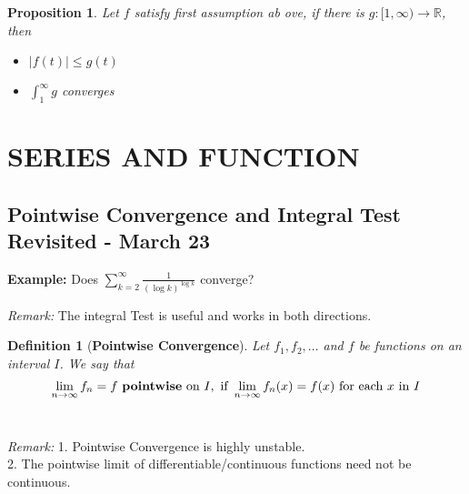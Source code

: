 \documentclass[12pt]{article}
\theoremstyle{plain}
\newtheorem{definition}{Definition}[subsection]
\newtheorem{proposition}{Proposition}[subsection]
\newcommand{\abs}[1]{\left| #1 \right|}
\newcommand{\mR}{{\mathbb{R}}}
\begin{document}
\begin{proposition}
	Let $f$ satisfy first assumption ab ove, if there is $g:[1,\infty) \to
	\mR$, then 
	\begin{itemize}
		\item $\abs{f(t)} \leq g(t)$
		\item $\int_1^{\infty} g$ converges
	\end{itemize}
\end{proposition}




\section{SERIES AND FUNCTION}
\subsection{Pointwise Convergence and Integral Test Revisited - March 23}
{\color{Brown}
	\textbf{Example: } Does $\sum_{k=2}^{\infty} \frac1{(\log k)^{\log k}}$
	converge? 
}

{\color{Orchid}
\textit{Remark: } The integral Test is useful and works in both directions.\\ 
}

\begin{definition}[\textbf{Pointwise Convergence}]
	Let $f_1, f_2, \ldots$  and $f$ be functions on an interval $I$. We say
	that
	\[
		\lim_{n\to\infty} f_n = f \text{ \textbf{pointwise} on } I,
		\text{ if } \lim_{n\to\infty} f_n(x) = f(x)
		\text{ for each } x \text{ in } I
	\]\\
\end{definition}


{\color{Orchid}
\textit{Remark:}
1. Pointwise Convergence is highly unstable. \\
2. The pointwise limit of differentiable/continuous functions need not be 
continuous. 
}




\end{document}
